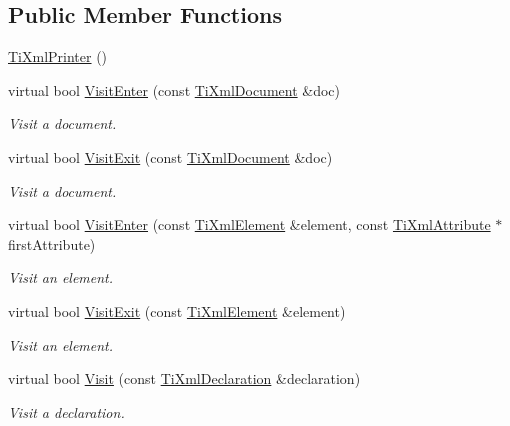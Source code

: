 \subsection*{Public Member Functions}
\begin{DoxyCompactItemize}
\item 
\hyperlink{class_ti_xml_printer_a6539b864026c8667cd0bd5fdf4b41f43}{TiXmlPrinter} ()
\item 
virtual bool \hyperlink{class_ti_xml_printer_a2ec73087db26ff4d2c4316c56f861db7}{VisitEnter} (const \hyperlink{class_ti_xml_document}{TiXmlDocument} \&doc)
\begin{DoxyCompactList}\small\item\em Visit a document. \item\end{DoxyCompactList}\item 
virtual bool \hyperlink{class_ti_xml_printer_a0a636046fa589b6d7f3e5bd025b3f33e}{VisitExit} (const \hyperlink{class_ti_xml_document}{TiXmlDocument} \&doc)
\begin{DoxyCompactList}\small\item\em Visit a document. \item\end{DoxyCompactList}\item 
virtual bool \hyperlink{class_ti_xml_printer_a6dccaf5ee4979f13877690afe28721e8}{VisitEnter} (const \hyperlink{class_ti_xml_element}{TiXmlElement} \&element, const \hyperlink{class_ti_xml_attribute}{TiXmlAttribute} $\ast$firstAttribute)
\begin{DoxyCompactList}\small\item\em Visit an element. \item\end{DoxyCompactList}\item 
virtual bool \hyperlink{class_ti_xml_printer_ae6a1df8271df4bf62d7873c38e34aa69}{VisitExit} (const \hyperlink{class_ti_xml_element}{TiXmlElement} \&element)
\begin{DoxyCompactList}\small\item\em Visit an element. \item\end{DoxyCompactList}\item 
virtual bool \hyperlink{class_ti_xml_printer_adaf7eec4dc43ad071ff52b60361574f5}{Visit} (const \hyperlink{class_ti_xml_declaration}{TiXmlDeclaration} \&declaration)
\begin{DoxyCompactList}\small\item\em Visit a declaration. \item\end{DoxyCompactList}\item 

\end{DoxyCompactItemize}
